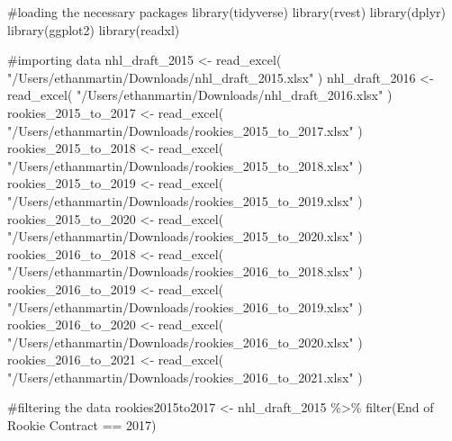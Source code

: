 \documentclass[
  letterpaper,
  DIV=11,
  numbers=noendperiod]{scrartcl}
\newenvironment{Shaded}{\begin{snugshade}}{\end{snugshade}}
\newcommand{\AttributeTok}[1]{\textcolor[rgb]{0.40,0.45,0.13}{#1}}
\newcommand{\CommentTok}[1]{\textcolor[rgb]{0.37,0.37,0.37}{#1}}
\newcommand{\DecValTok}[1]{\textcolor[rgb]{0.68,0.00,0.00}{#1}}
\newcommand{\FunctionTok}[1]{\textcolor[rgb]{0.28,0.35,0.67}{#1}}
\newcommand{\NormalTok}[1]{\textcolor[rgb]{0.00,0.23,0.31}{#1}}
\newcommand{\OtherTok}[1]{\textcolor[rgb]{0.00,0.23,0.31}{#1}}
\newcommand{\SpecialCharTok}[1]{\textcolor[rgb]{0.37,0.37,0.37}{#1}}
\newcommand{\StringTok}[1]{\textcolor[rgb]{0.13,0.47,0.30}{#1}}
\begin{document}
\begin{Shaded}
\begin{Highlighting}[]
\CommentTok{\#loading the necessary packages}
\FunctionTok{library}\NormalTok{(tidyverse)}
\FunctionTok{library}\NormalTok{(rvest)}
\FunctionTok{library}\NormalTok{(dplyr)}
\FunctionTok{library}\NormalTok{(ggplot2)}
\FunctionTok{library}\NormalTok{(readxl)}

\CommentTok{\#importing data}
\NormalTok{nhl\_draft\_2015 }\OtherTok{\textless{}{-}} \FunctionTok{read\_excel}\NormalTok{(}
  \StringTok{"/Users/ethanmartin/Downloads/nhl\_draft\_2015.xlsx"}
\NormalTok{  )}
\NormalTok{nhl\_draft\_2016 }\OtherTok{\textless{}{-}} \FunctionTok{read\_excel}\NormalTok{(}
  \StringTok{"/Users/ethanmartin/Downloads/nhl\_draft\_2016.xlsx"}
\NormalTok{  )}
\NormalTok{rookies\_2015\_to\_2017 }\OtherTok{\textless{}{-}} \FunctionTok{read\_excel}\NormalTok{(}
  \StringTok{"/Users/ethanmartin/Downloads/rookies\_2015\_to\_2017.xlsx"}
\NormalTok{  )}
\NormalTok{rookies\_2015\_to\_2018 }\OtherTok{\textless{}{-}} \FunctionTok{read\_excel}\NormalTok{(}
  \StringTok{"/Users/ethanmartin/Downloads/rookies\_2015\_to\_2018.xlsx"}
\NormalTok{  )}
\NormalTok{rookies\_2015\_to\_2019 }\OtherTok{\textless{}{-}} \FunctionTok{read\_excel}\NormalTok{(}
  \StringTok{"/Users/ethanmartin/Downloads/rookies\_2015\_to\_2019.xlsx"}
\NormalTok{  )}
\NormalTok{rookies\_2015\_to\_2020 }\OtherTok{\textless{}{-}} \FunctionTok{read\_excel}\NormalTok{(}
  \StringTok{"/Users/ethanmartin/Downloads/rookies\_2015\_to\_2020.xlsx"}
\NormalTok{  )}
\NormalTok{rookies\_2016\_to\_2018 }\OtherTok{\textless{}{-}} \FunctionTok{read\_excel}\NormalTok{(}
  \StringTok{"/Users/ethanmartin/Downloads/rookies\_2016\_to\_2018.xlsx"}
\NormalTok{  )}
\NormalTok{rookies\_2016\_to\_2019 }\OtherTok{\textless{}{-}} \FunctionTok{read\_excel}\NormalTok{(}
  \StringTok{"/Users/ethanmartin/Downloads/rookies\_2016\_to\_2019.xlsx"}
\NormalTok{  )}
\NormalTok{rookies\_2016\_to\_2020 }\OtherTok{\textless{}{-}} \FunctionTok{read\_excel}\NormalTok{(}
  \StringTok{"/Users/ethanmartin/Downloads/rookies\_2016\_to\_2020.xlsx"}
\NormalTok{  )}
\NormalTok{rookies\_2016\_to\_2021 }\OtherTok{\textless{}{-}} \FunctionTok{read\_excel}\NormalTok{(}
  \StringTok{"/Users/ethanmartin/Downloads/rookies\_2016\_to\_2021.xlsx"}
\NormalTok{  )}

\CommentTok{\#filtering the data}
\NormalTok{rookies2015to2017 }\OtherTok{\textless{}{-}}\NormalTok{ nhl\_draft\_2015 }\SpecialCharTok{\%\textgreater{}\%}
  \FunctionTok{filter}\NormalTok{(}\StringTok{\textasciigrave{}}\AttributeTok{End of Rookie Contract}\StringTok{\textasciigrave{}} \SpecialCharTok{==} \DecValTok{2017}\NormalTok{)}


\end{Highlighting}
\end{Shaded}
\end{document}
